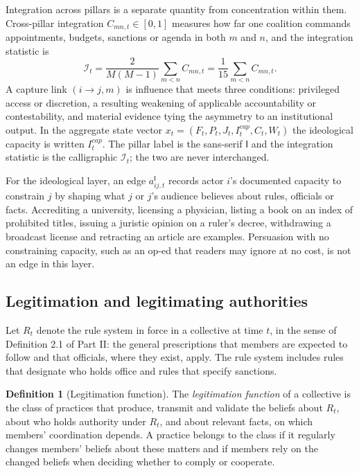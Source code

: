 \documentclass[11pt,letterpaper]{article}
\theoremstyle{definition}
\newtheorem{definition}[theorem]{Definition}
\theoremstyle{remark}
\newcommand{\pI}{\mathsf{I}}
\newcommand{\Int}{\mathcal{I}}
\begin{document}
Integration across pillars is a separate quantity from concentration within them. Cross-pillar integration $C_{mn,t}\in[0,1]$ measures how far one coalition commands appointments, budgets, sanctions or agenda in both $m$ and $n$, and the integration statistic is
\begin{equation}
\label{eq:integration}
\Int_t=\frac{2}{M(M-1)}\sum_{m<n} C_{mn,t}=\frac{1}{15}\sum_{m<n} C_{mn,t}.
\end{equation}
A capture link $(i\to j,m)$ is influence that meets three conditions: privileged access or discretion, a resulting weakening of applicable accountability or contestability, and material evidence tying the asymmetry to an institutional output. In the aggregate state vector $x_t=(F_t,P_t,J_t,I^{cap}_t,C_t,W_t)$ the ideological capacity is written $I^{cap}_t$. The pillar label is the sans-serif $\pI$ and the integration statistic is the calligraphic $\Int_t$; the two are never interchanged.

For the ideological layer, an edge $a^{\pI}_{ij,t}$ records actor $i$'s documented capacity to constrain $j$ by shaping what $j$ or $j$'s audience believes about rules, officials or facts. Accrediting a university, licensing a physician, listing a book on an index of prohibited titles, issuing a juristic opinion on a ruler's decree, withdrawing a broadcast license and retracting an article are examples. Persuasion with no constraining capacity, such as an op-ed that readers may ignore at no cost, is not an edge in this layer.

\subsection{Legitimation and legitimating authorities}

Let $R_t$ denote the rule system in force in a collective at time $t$, in the sense of Definition 2.1 of Part II: the general prescriptions that members are expected to follow and that officials, where they exist, apply. The rule system includes rules that designate who holds office and rules that specify sanctions.

\begin{definition}[Legitimation function]
\label{def:ideological-power:legitimation}
The \emph{legitimation function} of a collective is the class of practices that produce, transmit and validate the beliefs about $R_t$, about who holds authority under $R_t$, and about relevant facts, on which members' coordination depends. A practice belongs to the class if it regularly changes members' beliefs about these matters and if members rely on the changed beliefs when deciding whether to comply or cooperate.
\end{definition}
\end{document}
